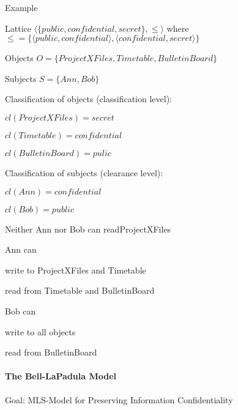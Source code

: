 \documentclass[a4paper]{article}
\begin{document}
\begin{multicols}{3}
    Example
    \begin{itemize*}
        \item Lattice $⟨\{public,confidential,secret\},\leq⟩$ where $\leq=\{⟨public,confidential⟩,⟨confidential,secret⟩\}$
        \item Objects $O=\{ProjectXFiles, Timetable, BulletinBoard\}$
        \item Subjects $S=\{Ann, Bob\}$
        \item Classification of objects (classification level):
              \begin{itemize*}
                  \item $cl(ProjectXFiles)=secret$
                  \item $cl(Timetable)=confidential$
                  \item $cl(BulletinBoard)=pulic$
              \end{itemize*}
        \item Classification of subjects (clearance level):
              \begin{itemize*}
                  \item $cl(Ann)=confidential$
                  \item $cl(Bob)=public$
              \end{itemize*}
        \item Neither Ann nor Bob can readProjectXFiles
        \item Ann can
              \begin{itemize*}
                  \item write to ProjectXFiles and Timetable
                  \item read from Timetable and BulletinBoard
              \end{itemize*}
        \item Bob can
              \begin{itemize*}
                  \item write to all objects
                  \item read from BulletinBoard
              \end{itemize*}
    \end{itemize*}


    \paragraph{The Bell-LaPadula Model}
    Goal: MLS-Model for Preserving Information Confidentiality


\end{multicols}
\end{document}
